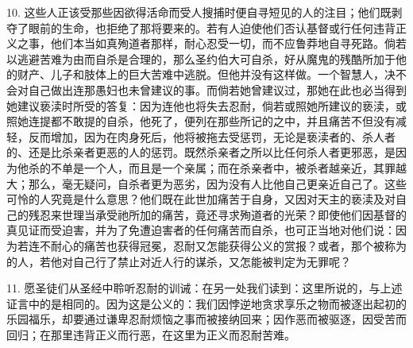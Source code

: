 10. 这些人正该受那些因欲得活命而受人搜捕时便自寻短见的人的注目；他们既剥夺了眼前的生命，也拒绝了那将要来的。若有人迫使他们否认基督或行任何违背正义之事，他们本当如真殉道者那样，耐心忍受一切，而不应鲁莽地自寻死路。倘若以逃避苦难为由而自杀是合理的，那么圣约伯大可自杀，好从魔鬼的残酷所加于他的财产、儿子和肢体上的巨大苦难中逃脱。但他并没有这样做。一个智慧人，决不会对自己做出连那愚妇也未曾建议的事。而倘若她曾建议过，那她在此也必当得到她建议亵渎时所受的答复：因为连他也将失去忍耐，倘若或照她所建议的亵渎，或照她连提都不敢提的自杀，他死了，便列在那些所记的之中，并且痛苦不但没有减轻，反而增加，因为在肉身死后，他将被拖去受惩罚，无论是亵渎者的、杀人者的、还是比杀亲者更恶的人的惩罚。既然杀亲者之所以比任何杀人者更邪恶，是因为他杀的不单是一个人，而且是一个亲属；而在杀亲者中，被杀者越亲近，其罪越大；那么，毫无疑问，自杀者更为恶劣，因为没有人比他自己更亲近自己了。这些可怜的人究竟是什么意思？他们既在此世加痛苦于自身，又因对天主的亵渎及对自己的残忍来世理当承受祂所加的痛苦，竟还寻求殉道者的光荣？即使他们因基督的真见证而受迫害，并为了免遭迫害者的任何痛苦而自杀，也可正当地对他们说：因为若连不耐心的痛苦也获得冠冕，忍耐又怎能获得公义的赏报？或者，那个被称为的人，若他对自己行了禁止对近人行的谋杀，又怎能被判定为无罪呢？\par

11. 愿圣徒们从圣经中聆听忍耐的训诫：在另一处我们读到：这里所说的，与上述证言中的是相同的。因为这是公义的：我们因悖逆地贪求享乐之物而被逐出起初的乐园福乐，却要通过谦卑忍耐烦恼之事而被接纳回来；因作恶而被驱逐，因受苦而回归；在那里违背正义而行恶，在这里为正义而忍耐苦难。\par

